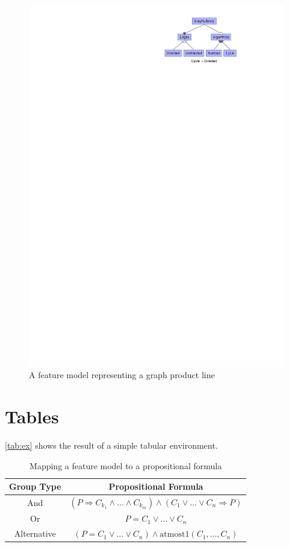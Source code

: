\begin{figure}[htbp]
	\centering
		\includegraphics[scale=1.25]{gfx/example}
	\caption{A feature model representing a graph product line}
	\label{fig:ex}
\end{figure}

\section{Tables}

\autoref{tab:ex} shows the result of a simple tabular environment.

\begin{table}[htbp]
        \caption{Mapping a feature model to a propositional formula} 
	\centering
		\begin{tabular}{cc}\toprule
			Group Type & Propositional Formula\\\midrule
			And & $(P \Rightarrow C_{k_1} \wedge\ldots\wedge C_{k_m}) \land (C_1\vee\ldots\vee C_n \Rightarrow P)$\\\addlinespace
			Or & $P = C_1\vee\ldots\vee C_n$\\
			Alternative & $(P = C_1\vee\ldots\vee C_n) \land \mbox{atmost}1(C_1,\ldots,C_n)$\\
			\bottomrule
		\end{tabular}
	\label{tab:ex}
\end{table}


